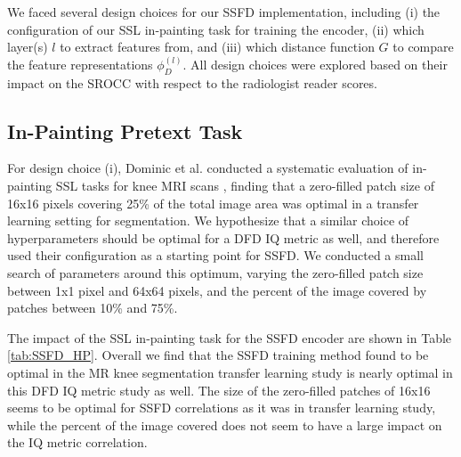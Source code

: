 \documentclass[AMA,STIX2COL,Linenumberson]{MRM}
\begin{document}
We faced several design choices for our SSFD implementation, including (i) the configuration of our SSL in-painting task for training the encoder, (ii) which layer(s) $l$ to extract features from, and (iii) which distance function $G$ to compare the feature representations $\phi_D^{(l)}$. All design choices were explored based on their impact on the SROCC with respect to the radiologist reader scores. 

\subsection{In-Painting Pretext Task}\label{sec:SSFD_DC}

For design choice (i), Dominic et al. conducted a systematic evaluation of in-painting SSL tasks for knee MRI scans \cite{dominic2023improving}, finding that a zero-filled patch size of 16x16 pixels covering 25\% of the total image area was optimal in a transfer learning setting for segmentation. We hypothesize that a similar choice of hyperparameters should be optimal for a DFD IQ metric as well, and therefore used their configuration as a starting point for SSFD. We conducted a small search of parameters around this optimum, varying the zero-filled patch size between 1x1 pixel and 64x64 pixels, and the percent of the image covered by patches between 10\% and 75\%.

The impact of the SSL in-painting task for the SSFD encoder are shown in Table \ref{tab:SSFD_HP}. Overall we find that the SSFD training method found to be optimal in the MR knee segmentation transfer learning study \cite{dominic2023improving} is nearly optimal in this DFD IQ metric study as well. The size of the zero-filled patches of 16x16 seems to be optimal for SSFD correlations as it was in transfer learning study, while the percent of the image covered does not seem to have a large impact on the IQ metric correlation.
\end{document}

